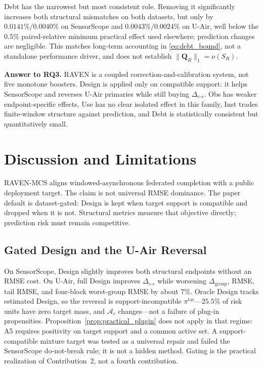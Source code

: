 \documentclass[letterpaper,journal]{IEEEtran}
\begin{document}
Debt has the narrowest but most consistent role.  Removing it significantly
increases both structural mismatches on both datasets, but only by
$0.0141\%/0.0040\%$ on SensorScope and
$0.0043\%/0.0024\%$ on U-Air, well below the $0.5\%$ paired-relative
minimum practical effect used elsewhere; prediction changes are negligible.
This matches long-term accounting in \eqref{eq:debt_bound}, not a
standalone performance driver, and does not establish
$\|\mathbf Q_R\|_1=o(S_R)$.

\noindent\textbf{Answer to RQ3.}
RAVEN is a coupled correction-and-calibration system, not five monotone
boosters.  Design is applied only on compatible support: it helps
SensorScope and reverses U-Air primaries while still buying
$\Delta_{c\text{-}s}$.  Obs has weaker endpoint-specific effects, Use
has no clear isolated effect in this family, Inst trades finite-window
structure against prediction, and Debt is statistically consistent but
quantitatively small.

\section{Discussion and Limitations}
\label{sec:discussion}

RAVEN-MCS aligns windowed-asynchronous federated completion with a public
deployment target.  The claim is not universal RMSE dominance.
The paper default is dataset-gated: Design is kept when target support is
compatible and dropped when it is not.  Structural metrics measure that
objective directly; prediction risk must remain competitive.

\subsection{Gated Design and the U-Air Reversal}
\label{subsec:discussion_gate}

On SensorScope, Design slightly improves both structural endpoints
without an RMSE cost.  On U-Air, full Design improves
$\Delta_{c\text{-}s}$ while worsening $\Delta_{\mathrm{group}}$,
RMSE, tail RMSE, and four-block worst-group RMSE by about $7\%$.
Oracle Design tracks estimated Design, so the reversal is
support-incompatible $\pi^{\mathrm{tar}}$---$25.5\%$ of risk units
have zero target mass, and $\mathcal{A}_r$ changes---not a failure of
plug-in propensities.  Proposition~\ref{prop:practical_plugin} does
not apply in that regime: A5 requires positivity on target support and
a common active set.  A support-compatible mixture target was tested as
a universal repair and failed the SensorScope do-not-break rule; it is
not a hidden method.  Gating is the practical realization of
Contribution~2, not a fourth contribution.
\end{document}
